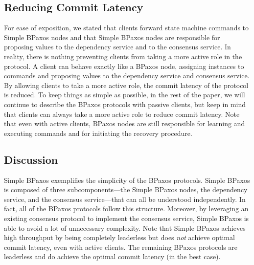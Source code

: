 \subsection{Reducing Commit Latency}
For ease of exposition, we stated that clients forward state machine commands
to Simple BPaxos nodes and that Simple BPaxos nodes are responsible for
proposing values to the dependency service and to the consensus service. In
reality, there is nothing preventing clients from taking a more active role in
the protocol. A client can behave exactly like a BPaxos node, assigning
instances to commands and proposing values to the dependency service and
consensus service.
%
By allowing clients to take a more active role, the commit latency of the
protocol is reduced. To keep things as simple as possible, in the rest of the
paper, we will continue to describe the BPaxos protocols with passive clients,
but keep in mind that clients can always take a more active role to reduce
commit latency.
%
Note that even with active clients, BPaxos nodes are still responsible for
learning and executing commands and for initiating the recovery procedure.

\subsection{Discussion}
Simple BPaxos exemplifies the simplicity of the BPaxos protocols. Simple BPaxos
is composed of three subcomponents---the Simple BPaxos nodes, the dependency
service, and the consensus service---that can all be understood independently.
In fact, all of the BPaxos protocols follow this structure.
%
Moreover, by leveraging an existing consensus protocol to implement the
consensus service, Simple BPaxos is able to avoid a lot of unnecessary
complexity.
%
Note that Simple BPaxos achieves high throughput by being completely leaderless
but does \emph{not} achieve optimal commit latency, even with active clients.
The remaining BPaxos protocols are leaderless and do achieve the optimal commit
latency (in the best case).
